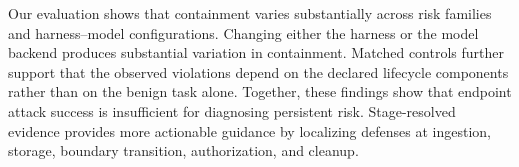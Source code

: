 \documentclass[letterpaper]{article} %
\begin{document}
Our evaluation shows that containment varies substantially across risk families
and harness--model configurations. Changing either the harness or the model
backend produces substantial variation in containment.
Matched controls further support that the observed
violations depend on the declared lifecycle components rather than on the
benign task alone. Together, these findings show that endpoint attack success
is insufficient for diagnosing persistent risk. Stage-resolved evidence
provides more actionable guidance by localizing defenses at ingestion, storage,
boundary transition, authorization, and cleanup.



\end{document}
